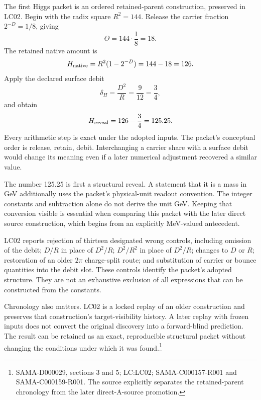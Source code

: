 The first Higgs packet is an ordered retained-parent construction, preserved in LC02. Begin with the radix square $R^2=144$. Release the carrier fraction $2^{-D}=1/8$, giving
\begin{equation}
\Theta=144\cdot\frac18=18.
\end{equation}
The retained native amount is
\begin{equation}
H_{\rm native}=R^2(1-2^{-D})=144-18=126.
\end{equation}
Apply the declared surface debit
\begin{equation}
\delta_H=\frac{D^2}{R}=\frac9{12}=\frac34,
\end{equation}
and obtain
\begin{equation}
H_{\rm reveal}=126-\frac34=125.25.
\label{v2c3:higgsretained}
\end{equation}
Every arithmetic step is exact under the adopted inputs. The packet's conceptual order is release, retain, debit. Interchanging a carrier share with a surface debit would change its meaning even if a later numerical adjustment recovered a similar value.

The number 125.25 is first a structural reveal. A statement that it is a mass in GeV additionally uses the packet's physical-unit readout convention. The integer constants and subtraction alone do not derive the unit GeV. Keeping that conversion visible is essential when comparing this packet with the later direct source construction, which begins from an explicitly MeV-valued antecedent.

LC02 reports rejection of thirteen designated wrong controls, including omission of the debit; $D/R$ in place of $D^2/R$; $D^2/R^2$ in place of $D^2/R$; changes to $D$ or $R$; restoration of an older $2\pi$ charge-split route; and substitution of carrier or bounce quantities into the debit slot. These controls identify the packet's adopted structure. They are not an exhaustive exclusion of all expressions that can be constructed from the constants.

Chronology also matters. LC02 is a locked replay of an older construction and preserves that construction's target-visibility history. A later replay with frozen inputs does not convert the original discovery into a forward-blind prediction. The result can be retained as an exact, reproducible structural packet without changing the conditions under which it was found.\footnote{SAMA-D000029, sections 3 and 5; LC:LC02; SAMA-C000157-R001 and SAMA-C000159-R001. The source explicitly separates the retained-parent chronology from the later direct-A-source promotion.}

